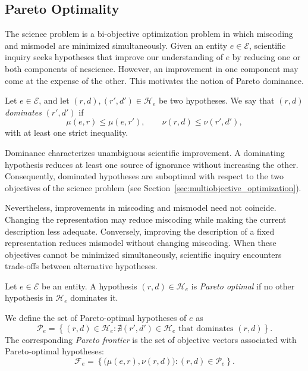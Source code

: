 
\subsection*{Pareto Optimality}
\label{sec:nescience_pareto}

The science problem is a bi-objective optimization problem in which miscoding and mismodel are minimized simultaneously. Given an entity $e\in\mathcal E$, scientific inquiry seeks hypotheses that improve our understanding of $e$ by reducing one or both components of nescience. However, an improvement in one component may come at the expense of the other. This motivates the notion of Pareto dominance.

\begin{definition}
Let $e\in\mathcal E$, and let $(r,d),(r',d')\in\mathcal H_e$ be two hypotheses. We say that $(r,d)$
\emph{dominates} $(r',d')$ if
\[
\mu(e,r)\leq\mu(e,r'), \qquad \nu(r,d)\leq\nu(r',d'),
\]
with at least one strict inequality.
\end{definition}

Dominance characterizes unambiguous scientific improvement. A dominating hypothesis reduces at least one source of ignorance without increasing the other. Consequently, dominated hypotheses are suboptimal with respect to the two objectives of the science problem (see Section~\ref{sec:multiobjective_optimization}).

Nevertheless, improvements in miscoding and mismodel need not coincide. Changing the representation may reduce miscoding while making the current description less adequate. Conversely, improving the description of a fixed representation reduces mismodel without changing miscoding. When these objectives cannot be minimized simultaneously, scientific inquiry encounters trade-offs between alternative hypotheses.

\begin{definition}
Let $e\in\mathcal E$ be an entity. A hypothesis $(r,d)\in\mathcal H_e$ is \emph{Pareto optimal}
 if no other hypothesis in $\mathcal H_e$ dominates it.

We define the set of Pareto-optimal hypotheses of $e$ as
\[
\mathcal P_e = \left\{ (r,d)\in\mathcal H_e : \nexists (r',d')\in\mathcal H_e \text{ that dominates } (r,d) \right\}.
\]
The corresponding \emph{Pareto frontier} is the set of objective vectors associated with Pareto-optimal hypotheses:
\[
\mathcal F_e = \left\{ \bigl(\mu(e,r),\nu(r,d)\bigr) : (r,d)\in\mathcal P_e \right\}.
\]
\end{definition}

